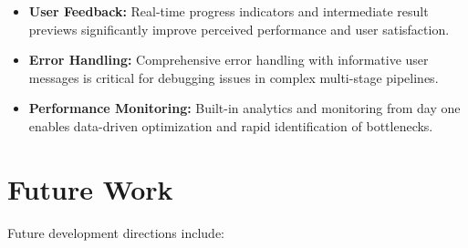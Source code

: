 \documentclass[12pt,oneside]{report}
\begin{document}
\begin{itemize}
    \item \textbf{User Feedback:} Real-time progress indicators and intermediate result previews significantly improve perceived performance and user satisfaction.
    
    \item \textbf{Error Handling:} Comprehensive error handling with informative user messages is critical for debugging issues in complex multi-stage pipelines.
    
    \item \textbf{Performance Monitoring:} Built-in analytics and monitoring from day one enables data-driven optimization and rapid identification of bottlenecks.
\end{itemize}

\section{Future Work}

Future development directions include:
\end{document}
